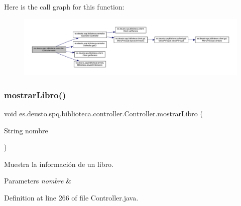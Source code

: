 Here is the call graph for this function\+:
\nopagebreak
\begin{figure}[H]
\begin{center}
\leavevmode
\includegraphics[width=350pt]{classes_1_1deusto_1_1spq_1_1biblioteca_1_1controller_1_1_controller_aebc01845557525b0f7326b2ad5c612b2_cgraph}
\end{center}
\end{figure}
\mbox{\label{classes_1_1deusto_1_1spq_1_1biblioteca_1_1controller_1_1_controller_a180523dc3bcc8baf2ff083b1fec1505c}} 
\subsubsection{\texorpdfstring{mostrar\+Libro()}{mostrarLibro()}}
{\footnotesize\ttfamily void es.\+deusto.\+spq.\+biblioteca.\+controller.\+Controller.\+mostrar\+Libro (\begin{DoxyParamCaption}\item[{String}]{nombre }\end{DoxyParamCaption})}

Muestra la información de un libro. 
\begin{DoxyParams}{Parameters}
{\em nombre} & \\
\hline
\end{DoxyParams}


Definition at line 266 of file Controller.\+java.


